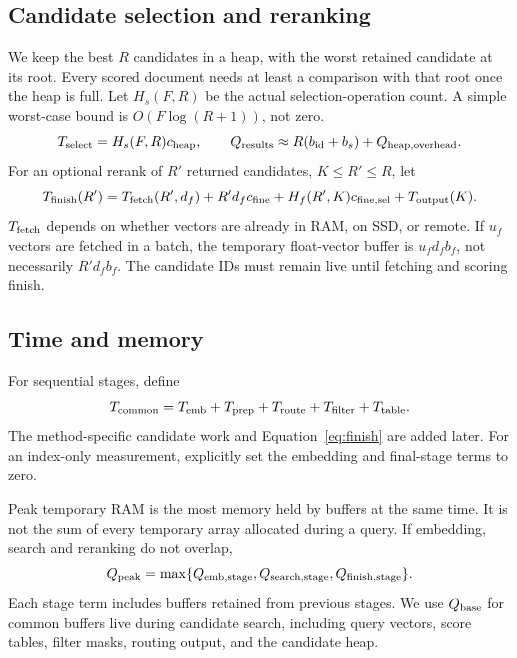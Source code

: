 \subsection{Candidate selection and reranking}
We keep the best $R$ candidates in a heap, with the worst retained candidate at its root. Every scored document needs
at least a comparison with that root once the heap is full. Let $H_s(F,R)$ be the actual
selection-operation count. A simple worst-case bound is $O(F\log(R+1))$, not zero.
\begin{equation}
T_{\rm select}=H_s(F,R)c_{\rm heap},\qquad
Q_{\rm results}\approx R(b_{\rm id}+b_s)+Q_{\rm heap,overhead}.
\label{eq:selection}
\end{equation}
For an optional rerank of $R'$ returned candidates, $K\leq R'\leq R$, let
\begin{equation}
T_{\mathrm{finish}}(R')=T_{\rm fetch}(R',d_f)+R'd_f c_{\rm fine}
              +H_f(R',K)c_{\rm fine,sel}+T_{\rm output}(K).
\label{eq:finish}
\end{equation}
$T_{\rm fetch}$ depends on whether vectors are already in RAM, on SSD, or remote. If $u_f$
vectors are fetched in a batch, the temporary float-vector buffer is $u_f d_f b_f$, not
necessarily $R'd_f b_f$. The candidate IDs must remain live until fetching and scoring finish.

\subsection{Time and memory}
For sequential stages, define
\begin{equation}
T_{\mathrm{common}}=T_{\rm emb}+T_{\rm prep}+T_{\rm route}+T_{\rm filter}+T_{\rm table}.
\label{eq:common-time}
\end{equation}
The method-specific candidate work and Equation~\eqref{eq:finish} are added later. For an
index-only measurement, explicitly set the embedding and final-stage terms to zero.

Peak temporary RAM is the most memory held by buffers at the same time. It is not the sum
of every temporary array allocated during a query. If embedding, search and reranking do not overlap,
\begin{equation}
Q_{\rm peak}=\max\{Q_{\rm emb,stage},Q_{\rm search,stage},Q_{\rm finish,stage}\}.
\label{eq:peak}
\end{equation}
Each stage term includes buffers retained from previous stages. We use $Q_{\mathrm{base}}$ for common
buffers live during candidate search, including query vectors, score tables, filter masks,
routing output, and the candidate heap.

